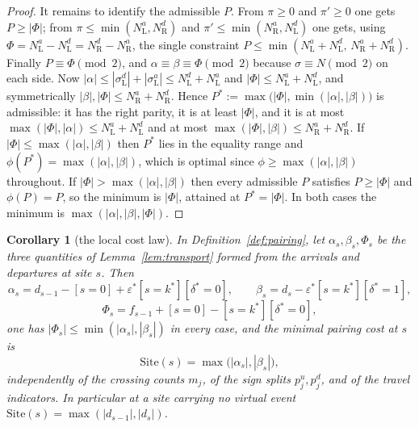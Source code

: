 \documentclass[11pt]{article}
\theoremstyle{plain}
\newtheorem{corollary}[theorem]{Corollary}
\theoremstyle{definition}
\theoremstyle{remark}
\begin{document}
\begin{proof}
It remains to identify the admissible $P$. From $\pi\ge0$ and $\pi'\ge0$ one gets $P\ge|\Phi|$;
from $\pi\le\min(N^a_{\mathrm L},N^d_{\mathrm R})$ and $\pi'\le\min(N^a_{\mathrm R},N^d_{\mathrm L})$
one gets, using $\Phi=N^a_{\mathrm L}-N^d_{\mathrm L}=N^d_{\mathrm R}-N^a_{\mathrm R}$, the single
constraint $P\le\min(N^a_{\mathrm L}+N^d_{\mathrm L},\,N^a_{\mathrm R}+N^d_{\mathrm R})$. Finally
$P\equiv\Phi\pmod2$, and $\alpha\equiv\beta\equiv\Phi\pmod2$ because $\sigma\equiv N\pmod2$ on each
side. Now $|\alpha|\le|\sigma^d_{\mathrm L}|+|\sigma^a_{\mathrm L}|\le
N^d_{\mathrm L}+N^a_{\mathrm L}$ and $|\Phi|\le N^a_{\mathrm L}+N^d_{\mathrm L}$, and symmetrically
$|\beta|,|\Phi|\le N^a_{\mathrm R}+N^d_{\mathrm R}$. Hence
$P^\ast:=\max\bigl(|\Phi|,\min(|\alpha|,|\beta|)\bigr)$ is admissible: it has the right parity, it
is at least $|\Phi|$, and it is at most $\max(|\Phi|,|\alpha|)\le N^a_{\mathrm L}+N^d_{\mathrm L}$
and at most $\max(|\Phi|,|\beta|)\le N^a_{\mathrm R}+N^d_{\mathrm R}$. If
$|\Phi|\le\max(|\alpha|,|\beta|)$ then $P^\ast$ lies in the equality range and
$\phi(P^\ast)=\max(|\alpha|,|\beta|)$, which is optimal since $\phi\ge\max(|\alpha|,|\beta|)$
throughout. If $|\Phi|>\max(|\alpha|,|\beta|)$ then every admissible $P$ satisfies $P\ge|\Phi|$ and
$\phi(P)=P$, so the minimum is $|\Phi|$, attained at $P^\ast=|\Phi|$. In both cases the minimum is
$\max(|\alpha|,|\beta|,|\Phi|)$.
\end{proof}

\begin{corollary}[the local cost law]\label{cor:localcost}
In Definition~\textup{\ref{def:pairing}}, let $\alpha_s,\beta_s,\Phi_s$ be the three quantities of
Lemma~\textup{\ref{lem:transport}} formed from the arrivals and departures at site $s$. Then
\[
  \alpha_s=d_{s-1}-[s=0]+\varepsilon^\ast[s=k^\ast][\delta^\ast=0],\qquad
  \beta_s=d_{s}-\varepsilon^\ast[s=k^\ast][\delta^\ast=1],
\]
\[
  \Phi_s=f_{s-1}+[s=0]-[s=k^\ast][\delta^\ast=0],
\]
one has $|\Phi_s|\le\min(|\alpha_s|,|\beta_s|)$ in every case, and the minimal pairing cost at $s$
is
\[
   \mathrm{Site}(s)=\max\bigl(|\alpha_s|,|\beta_s|\bigr),
\]
independently of the crossing counts $m_j$, of the sign splits $p^u_j,p^d_j$, and of the travel
indicators. In particular at a site carrying no virtual event
$\mathrm{Site}(s)=\max(|d_{s-1}|,|d_s|)$.
\end{corollary}
\end{document}
